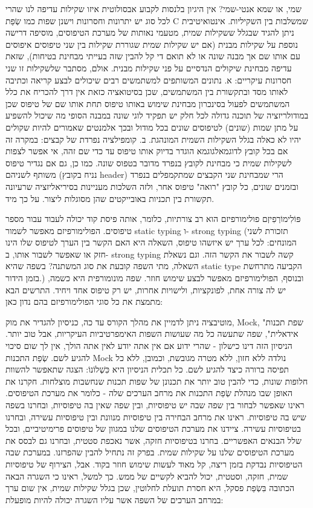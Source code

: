       שמי, או שמא אנטי-שמי?
      אין היגיון בלנסות לקבוע אבסולוטית איזו שקילות עדיפה לנו שהרי לכל סוג יש יתרונות וחסרונות וישנן שפות כמו שְׂפַת C שמשלבות בין השקיליות. אינטואיטיבית ניתן להגיד שבגלל ששקילות שמית, מטעמי נאותות של מערכת הטיפוסים, מוסיפה דרישה נוספת על שקילות מבנית (אם יש שקילות שמית שגוררת שקילות בין שני טיפוסים איפוסים עם אותו שם אך מבנה שונה או לא תואם די קל להבין שזה בעייתי מבחינת בטיחות), שזאת עדיפה מבחינת שיקולים הנדסיים על פני שקילות מבנית. אולם, מסתבר שלשקילות זו שני חסרונות עיקריים:
      א. נתונים המשותפים למשתמשים רבים שיכולים לבצע קריאה וכתיבה לאותו מסד ובתקשורת בין המשתמשים, שכן בסיטואציה כזאת אין דרך להכריח את כלל המשתמשים לפעול בסינכרון מבחינת שימוש באותו טיפוס תחת אותו שם של טיפוס שכן במודולריזציה של תוכנה גדולה לכל חלק יש תפקיד לוגי שונה במבנה הסופי מה שיכול להשפיע על מתן שמות (שונים) לטיפוסים שונים בכל מודול ובכך אלמנטים שאמורים להיות שקולים יהיו לא כאלה בגלל השקילות השמית המונהגת.
      ב. קומפילציה נפרדת של קבצים: במקרה זה אם בכל קובץ לדוגמאלגוגמא הוגדר בדיוק אותו טיפוס עד כדי שם זהה, אי אפשר לצפות לשקילות שמית כי מבחינת לקובץ בנפרד מדובר בטפוס שונה. כמו כן, גם אם נגדיר טיפוס משותף לשניהם (נניח בקובץ header) הרי שמבחינת שני הקבצים שמתקמפלים בנפרד ובזמנים שונים, כל קובץ "רואה" טיפוס אחר, ולזה השלכות מעניינות בסיריאליזציה שרעיונה תקשורת בין תכניות באובייקטים שהן מסוגלות ליצור. על כך מיד.

      פּוֹלִימוֹרְפִיזְם
      פולימורפיזם הוא רב צורתיות, כלומר, אותה פיסת קוד יכולה לעבוד עבור מספר טיפוסים. הפולימורפיזם מאפשר לשמור static typing ו- strong typing (תזכורת לשני המונחים: לכל ערך יש איזשהו טיפוס, השאלה היא האם הקשר בין הערך לטיפוס שלו הינו חזק או שאפשר לשבור אותו, ב- strong typing קשה לשבור את הקשר הזה. וגם נשאלת השאלה, מתי השפה קובעת את סוג המשתנה? בשפה שהיא static type הקביעה מתרחשת בזמן הידור.) ובנוסף, הפולימורפיזם מאפשר לבצע שימוש חוזר. שפה מונומורפית היא כשמה, יש לה צורה אחת, לפונקציות, ולישויות אחרות, יש רק טיפוס אחד ויחיד.
      התרשים הבא מתמצת את כל סוגי הפולימורפיזם בהם נדון כאן:

      מוטיבציה
      ניתן לדמיין את מהלך הקורס עד כה, כניסיון להגדיר את מוק, Mock, "שפת תכנות אידאלית", שפה שתעשה כל מה שעושות השפות האימפרטיביות העיקריות, אבל טוב יותר. הניסיון הזה דינו כישלון - שהרי ידוע אם אין אתה יודע לאין אתה הולך, אין לך שום סיכוי להגיע לשם. שְׂפַת התכנות Mock נולדה ללא חזון, ללא מטרה מגובשת, וכמובן, ללא כל תפיסה ברורה כיצד להגיע לשם. כל תכלית הניסיון היא כִּשְׁלוֹנוֹ: הצגה שתאפשר להשוות חלופות שונות, כדי להבין טוב יותר את תכנונן של שפות תכנות שנחשבות מוצלחות.
      חקרנו את האופן שבו מנהלת שְׂפַת התכנות את מרחב הערכים שלה - כלומר את מערכת הטיפוסים. ראינו שאפשר לבחור בין שפה שבה יש טיפוסיות, ובין שפה שאין בה טיפוסיות, ובחרנו בשפה שיש בה טיפוסיות. ראינו את מרחב הבחירה בין טיפוסיות מנוונת ובין טיפוסיות עשירה, ובחרנו בטיפוסיות עשירה. ציידנו את מערכת הטיפוסים שלנו במגוון של טיפוסים פרימיטיביים, ובכל שלל הבנאים האפשריים. בחרנו בטיפוסיות חזקה, אשר נאכפת סטטית, ובחרנו גם לבסס את מערכת הטיפוסים שלנו על שקילות שמית.
      בפרק זה נתחיל להבין שהפרזנו. במערכת שבה הטיפוסיות נבדקת בזמן ריצה, קל מאוד לעשות שימוש חוזר בקוד. אבל, הצירוף של טיפוסיות שמית, חזקה, וסטטית, יכול להביא לקשיים של ממש. כך למשל, ראינו כי השגרה הבאה הכתובה בִּשְׂפַת פסקל, היא חסרת תועלת לחלוטין, שכן בגלל שקילות שמית, אין שום ערך במרחב הערכים של השפה אשר עליו השגרה יכולה להיות מופעלת:


